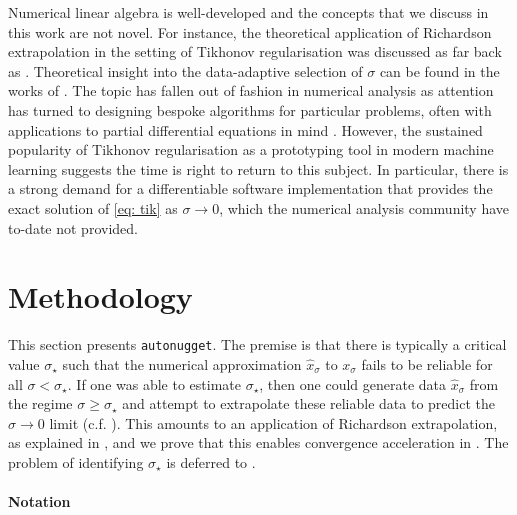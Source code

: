 \documentclass[10pt]{article} %
\newcommand{\nugget}{\sigma}
\begin{document}
Numerical linear algebra is well-developed and the concepts that we discuss in this work are not novel.
For instance, the theoretical application of Richardson extrapolation in the setting of Tikhonov regularisation was discussed as far back as \citet{groetsch1979extrapolation,thomas1979approximation}.
Theoretical insight into the data-adaptive selection of $\nugget$ can be found in the works of \citet{gfrerer1987posteriori,engl1987choice,liu2013dynamical}.
The topic has fallen out of fashion in numerical analysis as attention has turned to designing bespoke algorithms for particular problems, often with applications to partial differential equations in mind \citep{mardal2011preconditioning,kunoth2018splines}. 
However, the sustained popularity of Tikhonov regularisation as a prototyping tool in modern machine learning suggests the time is right to return to this subject.
In particular, there is a strong demand for a differentiable software implementation that provides the exact solution of \eqref{eq: tik} as $\nugget \rightarrow 0$, which the numerical analysis community have to-date not provided.

















\section{Methodology}
This section presents \texttt{autonugget}.
The premise is that there is typically a critical value $\nugget_{\star}$ such that the numerical approximation $\hat{x}_\nugget$ to $x_\nugget$ fails to be reliable for all $\nugget < \nugget_{\star}$.
If one was able to estimate $\nugget_{\star}$, then one could generate data $\hat{x}_\nugget$ from the regime $\nugget \geq \nugget_{\star}$ and attempt to extrapolate these reliable data to predict the $\nugget \rightarrow 0$ limit (c.f. ).
This amounts to an application of Richardson extrapolation, as explained in , and we prove that this enables convergence acceleration in .
The problem of identifying $\nugget_{\star}$ is deferred to .

\paragraph{Notation}
\end{document}
